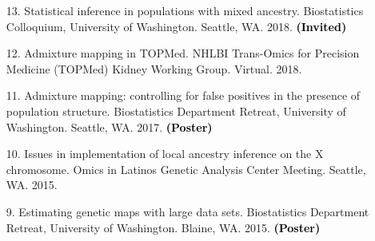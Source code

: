 \documentclass[margin]{res}
\newcommand{\annotate}[1]{\textcolor{black}{\textbf{(#1)}}}
\begin{document}
\begin{resume}
\begin{itemize}



\item[13.] %
Statistical inference in populations with mixed ancestry. 
Biostatistics Colloquium, University of Washington. Seattle, WA. 2018.  
\annotate{Invited}

\item[12.] Admixture mapping in TOPMed. 
NHLBI Trans-Omics for Precision Medicine (TOPMed) Kidney Working Group. Virtual. 2018.  


\item[11.] %
Admixture mapping: controlling for false positives in the presence of population structure. 
Biostatistics Department Retreat, University of Washington. Seattle, WA. 2017. 
\annotate{Poster}



\item[10.] %
Issues in implementation of local ancestry inference on the X chromosome. 
Omics in Latinos Genetic Analysis Center Meeting. Seattle, WA. 2015.

\item[9.] %
Estimating genetic maps with large data sets. 
Biostatistics Department Retreat, University of Washington. Blaine, WA. 2015. 
\annotate{Poster}


\end{itemize}
\end{resume}
\end{document}

